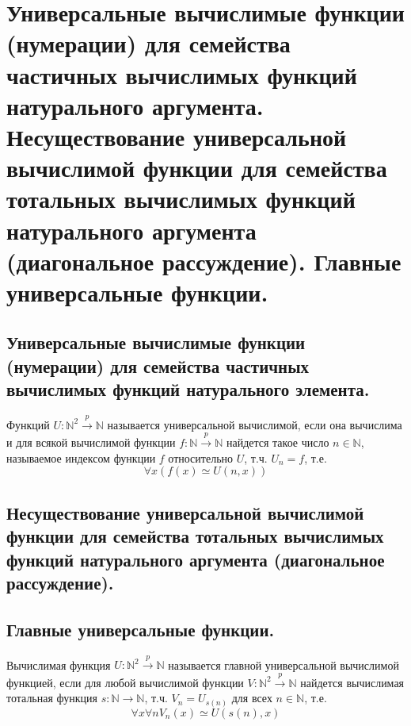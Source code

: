 \section{Универсальные вычислимые функции (нумерации) для семейства частичных вычислимых функций натурального аргумента. Несуществование универсальной вычислимой функции для семейства тотальных вычислимых функций натурального аргумента (диагональное рассуждение). Главные универсальные функции.}

\subsection{Универсальные вычислимые функции (нумерации) для семейства частичных вычислимых функций натурального элемента.}

\begin{definition}
  Функций $U : \mathbb{N}^2 \overset{p}{\to} \mathbb{N}$ называется универсальной вычислимой, если она вычислима и для всякой вычислимой функции $f : \mathbb{N} \overset{p}{\to} \mathbb{N}$ найдется такое число $n \in \mathbb{N}$, называемое индексом функции $f$ относительно $U$, т.ч. $U_n = f$, т.е.
  \[
    \forall x (f(x) \simeq U(n, x))
  \] 
\end{definition}

\subsection{Несуществование универсальной вычислимой функции для семейства тотальных вычислимых функций натурального аргумента (диагональное рассуждение).}

\subsection{Главные универсальные функции.}

\begin{definition}
  Вычислимая функция $U : \mathbb{N}^2 \overset{p}{\to} \mathbb{N}$ называется главной универсальной вычислимой функцией, если для любой вычислимой функции $V : \mathbb{N}^2 \overset{p}{\to} \mathbb{N}$ найдется вычислимая тотальная функция $s : \mathbb{N} \to \mathbb{N}$, т.ч. $V_n = U_{s(n)}$ для всех $n \in \mathbb{N}$, т.е.
  \[
    \forall x \forall n V_n(x) \simeq U(s(n), x)
  \]
\end{definition}